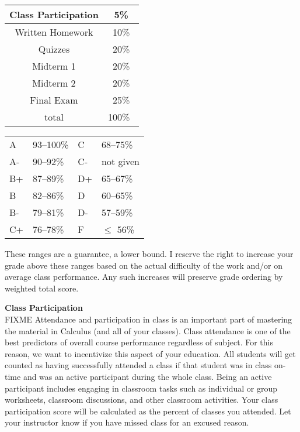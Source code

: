 \documentclass[12pt]{article}
\renewcommand{\emph}[1]{\textsf{\textbf{#1}}}
\newcommand{\localhead}[1]{\par\smallskip\textbf{#1} \smallskip\nobreak\\}%
\def\heading#1{\localhead{\large\emph{#1}}}
\begin{document}
\begin{multicols}{2}
\begin{tabular}{|c|c|}
\hline
Class Participation& 5\%\\
\hline
Written Homework& 10\% \\
\hline
Quizzes& 20\% \\
\hline
Midterm 1 & 20\% \\
\hline
Midterm 2 & 20\%  \\
\hline
Final Exam& 25\% \\
\hline
total& 100\% \, \\
\hline
\end{tabular}


\begin{tabular}{llll}
A  & 93--100\%& C  & 68--75\%  \\
A- & 90--92\% & C- & not given \\
B+ & 87--89\% & D+ & 65--67\%  \\
B  & 82--86\% & D  & 60--65\%  \\
B- & 79--81\% & D- & 57--59\%  \\
C+ & 76--78\% & F  & $\le$ 56\%
\end{tabular}
\end{multicols}

These ranges are a guarantee, a lower bound. I reserve the right to increase your grade above these ranges based on the actual difficulty of the work and/or on average class performance. Any such increases will preserve grade ordering by weighted total score. 

\heading{Class Participation}
FIXME Attendance and participation in class is an important part of mastering the material in Calculus (and all of your classes).  Class attendance is one of the best predictors of overall course performance regardless of subject.  For this reason, we want to incentivize this aspect of your education.  All students will get counted as having successfully attended a class if that student was in class on-time and was an active participant during the whole class.  Being an active participant includes engaging in classroom tasks such as individual or group worksheets, classroom discussions, and other classroom activities.  Your class participation score will be calculated as the percent of classes you attended.  Let your instructor know if you have missed class for an excused reason.
\end{document}
